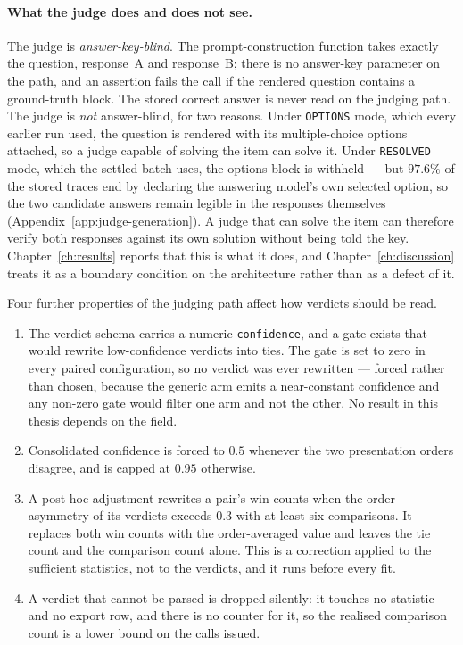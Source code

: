 \paragraph{What the judge does and does not see.}
The judge is \emph{answer-key-blind}. The prompt-construction function
takes exactly the question, response~A and response~B; there is no
answer-key parameter on the path, and an assertion fails the call if
the rendered question contains a ground-truth block. The stored correct
answer is never read on the judging path.
The judge is \emph{not} answer-blind, for two reasons.
Under \texttt{OPTIONS} mode, which every earlier run
used, the question is rendered with its multiple-choice options
attached, so a judge capable of solving the item can solve it. Under
\texttt{RESOLVED} mode, which the settled batch uses, the options block
is withheld --- but $97.6\%$ of the stored traces end by declaring the
answering model's own selected option, so the two candidate answers
remain legible in the responses themselves
(Appendix~\ref{app:judge-generation}). A judge that can solve the item
can therefore verify both responses against its own solution without
being told the key. Chapter~\ref{ch:results} reports that this is what
it does, and Chapter~\ref{ch:discussion} treats it as a boundary
condition on the architecture rather than as a defect of it.

Four further properties of the judging path affect how verdicts should
be read.

\begin{enumerate}
\item The verdict schema carries a numeric \texttt{confidence}, and a
gate exists that would rewrite low-confidence verdicts into ties. The
gate is set to zero in every paired configuration, so no verdict was
ever rewritten --- forced rather than chosen, because the generic arm
emits a near-constant confidence and any non-zero gate would filter
one arm and not the other. No result in this thesis depends on the
field.
\item Consolidated confidence is forced to $0.5$ whenever the two
presentation orders disagree, and is capped at $0.95$ otherwise.
\item A post-hoc adjustment rewrites a pair's win counts when the order
asymmetry of its verdicts exceeds $0.3$ with at least six comparisons.
It replaces both win counts with the order-averaged value and leaves
the tie count and the comparison count alone. This is a correction
applied to the sufficient statistics, not to the verdicts, and it runs
before every fit.
\item A verdict that cannot be parsed is dropped silently: it touches
no statistic and no export row, and there is no counter for it, so the
realised comparison count is a lower bound on the calls issued.
\end{enumerate}

